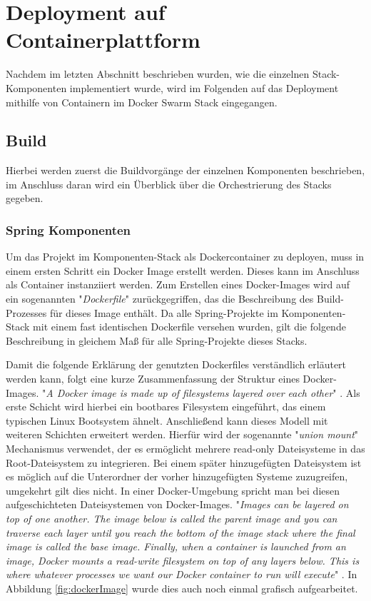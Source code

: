 \section{Deployment auf Containerplattform}
Nachdem im letzten Abschnitt beschrieben wurden, wie die einzelnen Stack-Komponenten implementiert wurde, wird im Folgenden auf das Deployment mithilfe von Containern im Docker Swarm Stack eingegangen. 

\subsection{Build}
Hierbei werden zuerst die Buildvorgänge der einzelnen Komponenten beschrieben, im Anschluss daran wird ein Überblick über die Orchestrierung des Stacks gegeben.

\subsubsection{Spring Komponenten}

Um das Projekt im Komponenten-Stack als Dockercontainer zu deployen, muss in einem ersten Schritt ein Docker Image erstellt werden. Dieses kann im Anschluss als Container instanziiert werden. Zum Erstellen eines Docker-Images wird auf ein sogenannten "\emph{Dockerfile}" zurückgegriffen, das die Beschreibung des Build-Prozesses für dieses Image enthält. Da alle Spring-Projekte im Komponenten-Stack mit einem fast identischen Dockerfile versehen wurden, gilt die folgende Beschreibung in gleichem Maß für alle Spring-Projekte dieses Stacks. 

Damit die folgende Erklärung der genutzten Dockerfiles verständlich erläutert werden kann, folgt eine kurze Zusammenfassung der Struktur eines Docker-Images. "\emph{A Docker image is made up of filesystems layered over each other}" \cite[Seite~71]{turnbulldocker}. Als erste Schicht wird hierbei ein bootbares Filesystem eingeführt, das einem typischen Linux Bootsystem ähnelt. Anschließend kann dieses Modell mit weiteren Schichten erweitert werden. Hierfür wird der sogenannte "\emph{union mount}" Mechanismus verwendet, der es ermöglicht mehrere read-only Dateisysteme in das Root-Dateisystem zu integrieren. Bei einem später hinzugefügten Dateisystem ist es möglich auf die Unterordner der vorher hinzugefügten Systeme zuzugreifen, umgekehrt gilt dies nicht. In einer Docker-Umgebung spricht man bei diesen aufgeschichteten Dateisystemen von Docker-Images. "\emph{Images can be layered on top of one another.  The image below is called the parent image and you can traverse each layer until you reach the bottom of the image stack where the final image is called the base image.  Finally, when a container is launched from an image, Docker mounts a read-write filesystem on top of any layers below. This is where whatever processes we want our Docker container to run will execute}" \cite[Seite~71]{turnbulldocker}. In Abbildung \ref{fig:dockerImage} wurde dies auch noch einmal grafisch aufgearbeitet.

